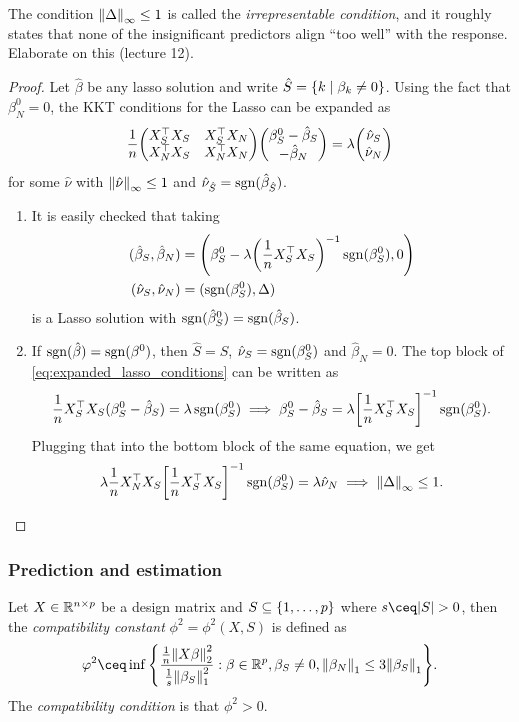 \begin{remark}
	The condition $\norm{\Delta}_{\infty} \leq 1$ is called the \emph{irrepresentable condition}, and it roughly states that none of the insignificant predictors align ``too well'' with the response. \TODO Elaborate on this (lecture 12). 
\end{remark}
\begin{proof}
	Let $\hat\beta$ be any lasso solution and write $\hat S = \qty{k \mid \beta_k \neq 0}$. Using the fact that $\beta^0_N = 0$, the KKT conditions for the Lasso can be expanded as
	\begin{equation} \label{eq:expanded_lasso_conditions}
	\frac1n \mqty(X_S\T X_S & X_S\T X_N \\ X_N\T X_S & X_N\T X_N) \mqty(\beta^0_S - \hat\beta_S\\ -\hat\beta_N) = \lambda \mqty(\hat\nu_S\\ \hat\nu_N)
	\end{equation}
	for some $\hat\nu$ with $\norm{\hat\nu}_\infty \leq 1$ and $\hat\nu_{\hat S} = \operatorname{sgn}(\hat\beta_{\hat S})$. 
	\begin{enumerate}
		\item It is easily checked that taking
		\begin{align*}
		(\hat\beta_S, \hat\beta_N) &= \qty(\beta^0_S - \lambda \qty(\frac1n X_S^\top X_S)^{-1} \operatorname{sgn}(\beta^0_S), 0) \\
		(\hat\nu_S, \hat\nu_N) &= (\operatorname{sgn}(\beta^0_S), \Delta)
		\end{align*}
		is a Lasso solution with $\operatorname{sgn}(\hat\beta^0_S) = \operatorname{sgn}(\hat\beta_S)$. 
		\item If $\operatorname{sgn}(\hat\beta) = \operatorname{sgn}(\beta^0)$, then $\hat S = S$, $\hat \nu_S= \operatorname{sgn}(\beta^0_S)$ and $\hat\beta_N = 0$. The top block of \cref{eq:expanded_lasso_conditions} can be written as
		\[
		\frac1n X_S^\top X_S (\beta^0_S - \hat\beta_S) = \lambda \operatorname{sgn}(\beta^0_S) \implies \beta^0_S - \hat\beta_S = \lambda \qty[\frac1n X_S^\top X_S]^{-1} \operatorname{sgn}(\beta^0_S). 
		\]
		Plugging that into the bottom block of the same equation, we get
		\[
		\lambda \frac1n X_N^\top X_S \qty[\frac1nX_S^\top X_S]^{-1} \operatorname{sgn}(\beta^0_S) = \lambda \hat\nu_N \implies \norm{\Delta}_\infty \leq 1. 
		\]
	\end{enumerate}
\end{proof}

\subsubsection{Prediction and estimation}
\begin{definition}
	Let $X \in \mathbb R^{n \times p}$ be a design matrix and $S \subseteq \qty{1, \dotsc, p}$ where $s \ceq \abs{S} > 0$, then the \emph{compatibility constant} $\phi^2 = \phi^2(X, S)$ is defined as
	\[
	\phi^2 \ceq \inf\qty{\frac{\frac1n \norm{X\beta}_2^2}{\frac1s \norm{\beta_S}_1^2} : \beta \in \RR^p, \beta_S \neq 0, \norm{\beta_N}_1 \leq 3 \norm{\beta_S}_1}. 
	\]
	The \emph{compatibility condition} is that $\phi^2 > 0$. 
\end{definition}

